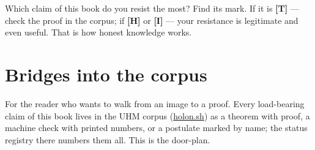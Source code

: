 \documentclass[11pt,letterpaper]{article}
\newcommand{\stT}{\textbf{[T]}\xspace}
\newcommand{\stI}{\textbf{[I]}\xspace}
\newcommand{\stH}{\textbf{[H]}\xspace}
\newcommand{\holonsh}{\href{https://holon.sh}{holon.sh}\xspace}
\begin{document}
\begin{askbox}
Which claim of this book do you resist the most? Find its mark. If
it is \stT{} --- check the proof in the corpus; if \stH{} or
\stI{} --- your resistance is legitimate and even useful. That is
how honest knowledge works.
\end{askbox}

\clearpage
\section*{Bridges into the corpus}

For the reader who wants to walk from an image to a proof. Every
load-bearing claim of this book lives in the UHM corpus (\holonsh)
as a theorem with proof, a machine check with printed numbers, or a
postulate marked by name; the status registry there numbers them
all. This is the door-plan.
\end{document}
